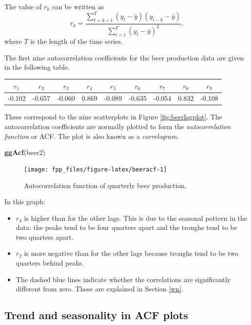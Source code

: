 \documentclass[]{book}
\newenvironment{Shaded}{\begin{snugshade}}{\end{snugshade}}
\newcommand{\KeywordTok}[1]{\textcolor[rgb]{0.13,0.29,0.53}{\textbf{#1}}}
\newcommand{\NormalTok}[1]{#1}
\providecommand{\tightlist}{%
  \setlength{\itemsep}{0pt}\setlength{\parskip}{0pt}}
\begin{document}
The value of \(r_{k}\) can be written as
\[
 r_{k} = \frac{\sum\limits_{t=k+1}^T (y_{t}-\bar{y})(y_{t-k}-\bar{y})}
 {\sum\limits_{t=1}^T (y_{t}-\bar{y})^2},
\]
where \(T\) is the length of the time series.

The first nine autocorrelation coefficients for the beer production data are given in the following table.

\begin{longtable}[]{@{}ccccccccc@{}}
\toprule
\(r_1\) & \(r_2\) & \(r_3\) & \(r_4\) & \(r_5\) & \(r_6\) & \(r_7\) & \(r_8\) & \(r_9\)\tabularnewline
\midrule
\endhead
-0.102 & -0.657 & -0.060 & 0.869 & -0.089 & -0.635 & -0.054 & 0.832 & -0.108\tabularnewline
\bottomrule
\end{longtable}

These correspond to the nine scatterplots in Figure \ref{fig:beerlagplot}. The autocorrelation coefficients are normally plotted to form the \emph{autocorrelation function} or ACF. The plot is also known as a \emph{correlogram}.

\begin{Shaded}
\begin{Highlighting}[]
\KeywordTok{ggAcf}\NormalTok{(beer2)}
\end{Highlighting}
\end{Shaded}

\begin{figure}

{\centering \texttt{[image: fpp\_files/figure-latex/beeracf-1]} 

}

\caption{Autocorrelation function of quarterly beer production.}\label{fig:beeracf}
\end{figure}

In this graph:

\begin{itemize}
\tightlist
\item
  \(r_{4}\) is higher than for the other lags. This is due to the seasonal pattern in the data: the peaks tend to be four quarters apart and the troughs tend to be two quarters apart.
\item
  \(r_{2}\) is more negative than for the other lags because troughs tend to be two quarters behind peaks.
\item
  The dashed blue lines indicate whether the correlations are significantly different from zero. These are explained in Section \ref{wn}.
\end{itemize}

\hypertarget{trend-and-seasonality-in-acf-plots}{%
\subsection*{Trend and seasonality in ACF plots}\label{trend-and-seasonality-in-acf-plots}}
\end{document}
